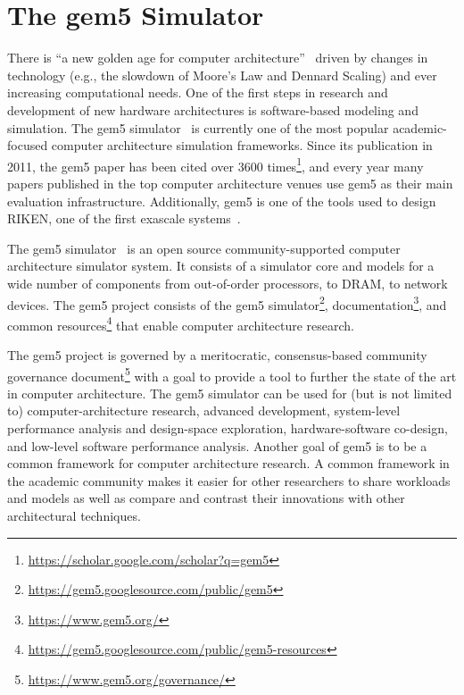 \section{The gem5 Simulator}


There is ``a new golden age for computer architecture''~\cite{HennessyPatterson-turingLect-isca18, HennessyPatterson-CACM19} driven by changes in technology (e.g., the slowdown of Moore's Law and Dennard Scaling) and ever increasing computational needs.
One of the first steps in research and development of new hardware architectures is software-based modeling and simulation.
The gem5 simulator~\cite{Binkert-gem5-2011} is currently one of the most popular academic-focused computer architecture simulation frameworks.
Since its publication in 2011, the gem5 paper has been cited over 3600 times\footnote{\url{https://scholar.google.com/scholar?q=gem5}}, and every year many papers published in the top computer architecture venues use gem5 as their main evaluation infrastructure.
Additionally, gem5 is one of the tools used to design RIKEN, one of the first exascale systems~\cite{Kodama:Riken:2019}.

The gem5 simulator~\cite{Binkert-gem5-2011} is an open source community-supported computer architecture simulator system.
It consists of a simulator core and models for a wide number of components from out-of-order processors, to DRAM, to network devices.
The gem5 project consists of the gem5 simulator\footnote{\url{https://gem5.googlesource.com/public/gem5}}, documentation\footnote{\url{https://www.gem5.org/}}, and common resources\footnote{\url{https://gem5.googlesource.com/public/gem5-resources}} that enable computer architecture research.

The gem5 project is governed by a meritocratic, consensus-based community governance document\footnote{\url{https://www.gem5.org/governance/}} with a goal to provide a tool to further the state of the art in computer architecture.
The gem5 simulator can be used for (but is not limited to) computer-architecture research, advanced development, system-level performance analysis and design-space exploration, hardware-software co-design, and low-level software performance analysis.
Another goal of gem5 is to be a common framework for computer architecture research.
A common framework in the academic community makes it easier for other researchers to share workloads and models as well as compare and contrast their innovations with other architectural techniques.

